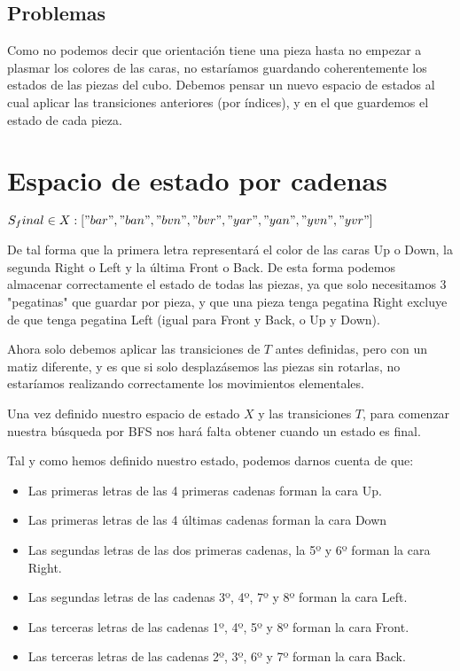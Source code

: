 \documentclass[11pt]{article}
\begin{document}
\subsection{Problemas}

Como no podemos decir que orientación tiene una pieza hasta no empezar a plasmar los colores de las caras, no estaríamos guardando coherentemente los estados de las piezas del cubo. Debemos pensar un nuevo espacio de estados al cual aplicar las transiciones anteriores (por índices), y en el que guardemos el estado de cada pieza.

\section{Espacio de estado por cadenas}

$S_final \in X : ["bar", "ban", "bvn", "bvr", "yar", "yan", "yvn", "yvr"]$
\newline

De tal forma que la primera letra representará el color de las caras Up o Down, la segunda Right o Left y la última Front o Back. De esta forma podemos almacenar correctamente el estado de todas las piezas, ya que solo necesitamos 3 "pegatinas" que guardar por pieza, y que una pieza tenga pegatina Right excluye de que tenga pegatina Left (igual para Front y Back, o Up y Down).
\newline

Ahora solo debemos aplicar las transiciones de $T$ antes definidas, pero con un matiz diferente, y es que si solo desplazásemos las piezas sin rotarlas, no estaríamos realizando correctamente los movimientos elementales.

Una vez definido nuestro espacio de estado $X$ y las transiciones $T$, para comenzar nuestra búsqueda por BFS nos hará falta obtener cuando un estado es final.

Tal y como hemos definido nuestro estado, podemos darnos cuenta de que:
\begin{itemize}
	\item  Las primeras letras de las 4 primeras cadenas forman la cara Up.
	\item  Las primeras letras de las 4 últimas cadenas forman la cara Down
	\item  Las segundas letras de las dos primeras cadenas, la 5º y 6º forman la cara Right.
	\item  Las segundas letras de las cadenas 3º, 4º, 7º y 8º forman la cara Left.
	\item  Las terceras letras de las cadenas 1º, 4º, 5º y 8º forman la cara Front.
	\item  Las terceras letras de las cadenas 2º, 3º, 6º y 7º forman la cara Back.
\end{itemize}
\end{document}
